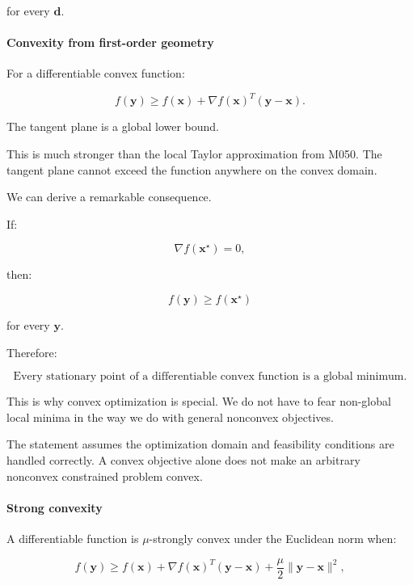 for every \(\mathbf d\).

\paragraph{Convexity from first-order geometry}\label{02-foundations-ii-ch026-convexity-from-first-order-geometry}

\hypertarget{02-foundations-ii-ch026-convexity-from-first-order-geometry}{}

For a differentiable convex function:

\[
\boxed{ f(\mathbf y)\ge f(\mathbf x)+ \nabla f(\mathbf x)^T(\mathbf y-\mathbf x) }.
\]

The tangent plane is a global lower bound.

This is much stronger than the local Taylor approximation from M050. The tangent plane cannot exceed the function anywhere on the convex domain.

We can derive a remarkable consequence.

If:

\[
\nabla f(\mathbf x^\star)=0,
\]

then:

\[
f(\mathbf y)\ge f(\mathbf x^\star)
\]

for every \(\mathbf y\).

Therefore:

\[
\boxed{ \text{Every stationary point of a differentiable convex function is a global minimum.} }
\]

This is why convex optimization is special. We do not have to fear non-global local minima in the way we do with general nonconvex objectives.

The statement assumes the optimization domain and feasibility conditions are handled correctly. A convex objective alone does not make an arbitrary nonconvex constrained problem convex.

\paragraph{Strong convexity}\label{02-foundations-ii-ch026-strong-convexity}

\hypertarget{02-foundations-ii-ch026-strong-convexity}{}

A differentiable function is \(\mu\)-strongly convex under the Euclidean norm when:

\[
f(\mathbf y)\ge f(\mathbf x)+ \nabla f(\mathbf x)^T(\mathbf y-\mathbf x) +\frac\mu2\|\mathbf y-\mathbf x\|^2,
\]

